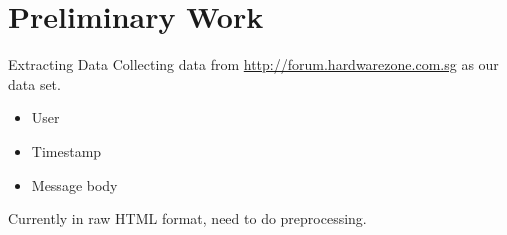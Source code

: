 \documentclass[compress]{beamer}
\begin{document}





\section{Preliminary Work}
\begin{frame}{Extracting Data}
	Collecting data from \url{http://forum.hardwarezone.com.sg} as our data set.
	\begin{itemize}
		\item User
		\item Timestamp
		\item Message body
	\end{itemize}
	
	Currently in raw HTML format, need to do preprocessing.

\end{frame}
\end{document}
